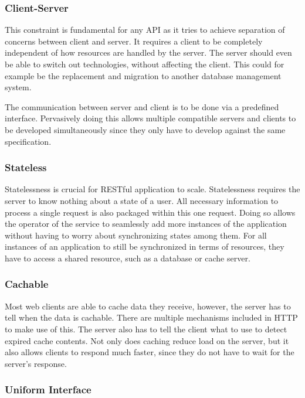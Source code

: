 \subsubsection{Client-Server}

This constraint is fundamental for any API as it tries to achieve
separation of concerns between client and server. It requires a client to be
completely independent of how resources are handled by the server. The server
should even be able to switch out technologies, without affecting the client.
This could for example be the replacement and migration to another database
management system.

The communication between server and client is to be done via a predefined
interface. Pervasively doing this allows multiple compatible servers and clients
to be developed simultaneously since they only have to develop against the same
specification.

\subsubsection{Stateless}

Statelessness is crucial for RESTful application to scale. Statelessness
requires the server to know nothing about a state of a user. All necessary
information to process a single request is also packaged within this one
request. Doing so allows the operator of the service to seamlessly add more
instances of the application without having to worry about synchronizing states
among them. For all instances of an application to still be synchronized in
terms of resources, they have to access a shared resource, such as a database
or cache server.

\subsubsection{Cachable}

Most web clients are able to cache data they receive, however, the server has
to tell when the data is cachable. There are multiple mechanisms included in
HTTP to make use of this. The server also has to tell the client what to use to
detect expired cache contents. Not only does caching reduce load on the server, but
it also allows clients to respond much faster, since they do not have to wait
for the server's response.

\subsubsection{Uniform Interface}

